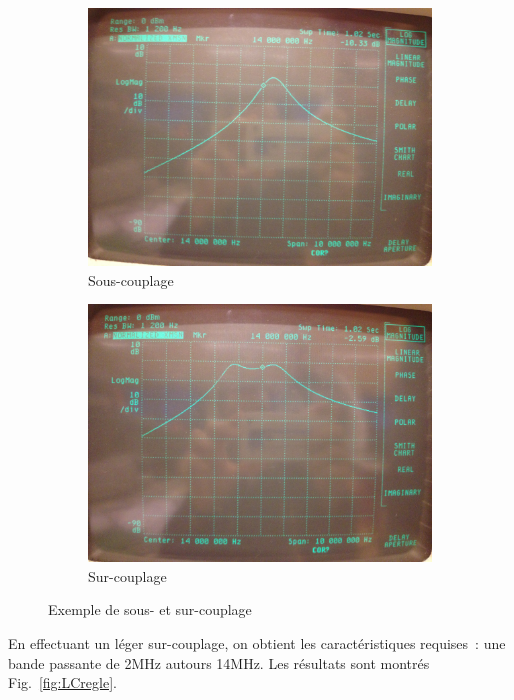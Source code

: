 \documentclass{article}
\begin{document}
\begin{figure}[h]
	\centering
	\begin{subfigure}[b]{0.43\textwidth}
		\centering
		\includegraphics[width=\textwidth]{souscouple}
		\caption{Sous-couplage}
	\end{subfigure}
	\hfill
	\begin{subfigure}[b]{0.43\textwidth}
		\centering
		\includegraphics[width=\textwidth]{surcouple}
		\caption{Sur-couplage}
	\end{subfigure}
	\caption{Exemple de sous- et sur-couplage}
	\label{fig:sur_sous_couple}
\end{figure}

En effectuant un léger sur-couplage, on obtient les caractéristiques requises~: une bande passante de 2MHz autours 14MHz. Les résultats sont montrés Fig.~\ref{fig:LCregle}.
\end{document}
